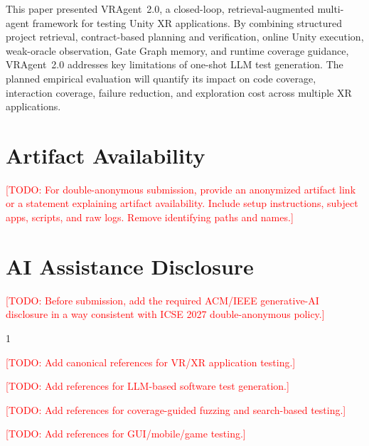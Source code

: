 \documentclass[10pt,conference]{IEEEtran}
\newcommand{\todo}[1]{\textcolor{red}{[TODO: #1]}}
\newcommand{\tool}{VRAgent~2.0}
\begin{document}
This paper presented \tool, a closed-loop, retrieval-augmented multi-agent
framework for testing Unity XR applications. By combining structured project
retrieval, contract-based planning and verification, online Unity execution,
weak-oracle observation, Gate Graph memory, and runtime coverage guidance, \tool
addresses key limitations of one-shot LLM test generation. The planned empirical
evaluation will quantify its impact on code coverage, interaction coverage,
failure reduction, and exploration cost across multiple XR applications.

\section*{Artifact Availability}

\todo{For double-anonymous submission, provide an anonymized artifact link or a
statement explaining artifact availability. Include setup instructions, subject
apps, scripts, and raw logs. Remove identifying paths and names.}

\section*{AI Assistance Disclosure}

\todo{Before submission, add the required ACM/IEEE generative-AI disclosure in a
way consistent with ICSE 2027 double-anonymous policy.}


\begin{thebibliography}{1}

\todo{Add canonical references for VR/XR application testing.}

\todo{Add references for LLM-based software test generation.}

\todo{Add references for coverage-guided fuzzing and search-based testing.}

\todo{Add references for GUI/mobile/game testing.}

\end{thebibliography}
\end{document}
